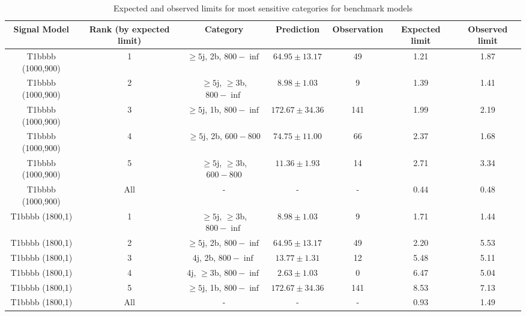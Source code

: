 \begin{landscape}
\begin{longtable}{ccccccc}
\caption{Expected and observed limits for most sensitive categories for benchmark models} \label{tab:benchMarkTable_T1bbbb} \\    \hline
Signal Model & Rank (by expected limit) & Category & Prediction & Observation & Expected limit & Observed limit\\ \hline
T1bbbb (1000,900) & 1 & $\ge5$j, 2b, $800-\inf$ & $64.95 \pm 13.17$ & 49 & 1.21 & 1.87\\ 
T1bbbb (1000,900) & 2 & $\ge5$j, $\ge3$b, $800-\inf$ & $8.98 \pm 1.03$ & 9 & 1.39 & 1.41\\ 
T1bbbb (1000,900) & 3 & $\ge5$j, 1b, $800-\inf$ & $172.67 \pm 34.36$ & 141 & 1.99 & 2.19\\ 
T1bbbb (1000,900) & 4 & $\ge5$j, 2b, $600-800$ & $74.75 \pm 11.00$ & 66 & 2.37 & 1.68\\ 
T1bbbb (1000,900) & 5 & $\ge5$j, $\ge3$b, $600-800$ & $11.36 \pm 1.93$ & 14 & 2.71 & 3.34\\ 
T1bbbb (1000,900) & All & - & - & - & 0.44 & 0.48\\ 
T1bbbb (1800,1) & 1 & $\ge5$j, $\ge3$b, $800-\inf$ & $8.98 \pm 1.03$ & 9 & 1.71 & 1.44\\ 
T1bbbb (1800,1) & 2 & $\ge5$j, 2b, $800-\inf$ & $64.95 \pm 13.17$ & 49 & 2.20 & 5.53\\ 
T1bbbb (1800,1) & 3 & 4j, 2b, $800-\inf$ & $13.77 \pm 1.31$ & 12 & 5.48 & 5.11\\ 
T1bbbb (1800,1) & 4 & 4j, $\ge3$b, $800-\inf$ & $2.63 \pm 1.03$ & 0 & 6.47 & 5.04\\ 
T1bbbb (1800,1) & 5 & $\ge5$j, 1b, $800-\inf$ & $172.67 \pm 34.36$ & 141 & 8.53 & 7.13\\ 
T1bbbb (1800,1) & All & - & - & - & 0.93 & 1.49\\ 
\hline
\hline
\end{longtable}
\end{landscape}
